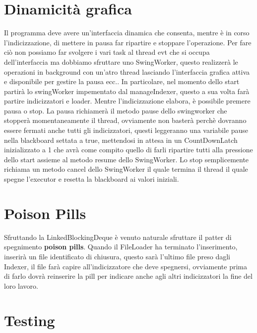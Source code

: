 \documentclass{article}
\begin{document}
\section{Dinamicità grafica}
Il programma deve avere un'interfaccia dinamica che consenta, mentre è in corso l'indicizzazione, di mettere in pausa far ripartire e stoppare l'operazione. Per fare ciò non possiamo far svolgere i vari task al thread evt che si occupa dell'interfaccia ma dobbiamo sfruttare uno SwingWorker, questo realizzerà le operazioni in background con un'atro thread lasciando l'interfaccia grafica attiva e disponibile per gestire la pausa ecc..
In particolare, nel momento dello start partirà lo swingWorker impementato dal manageIndexer, questo a sua volta farà partire indicizzatori e loader.
Mentre l'indicizzazione elabora, è possibile premere pausa o stop. La pausa richiamerà il metodo pause dello swingworker che stopperà momentaneamente il thread, ovviamente non basterà perchè dovranno essere fermati anche tutti gli indicizzatori, questi leggeranno una variabile pause nella blackboard settata a true,  mettendosi in attesa in un CountDownLatch inizializzato a 1 che avrà come compito quello di farli ripartire tutti alla pressione dello start assieme al metodo resume dello SwingWorker.
Lo stop semplicemente richiama un metodo cancel dello SwingWorker il quale termina il thread il quale spegne l'executor e resetta la blackboard ai valori iniziali.

\section{Poison Pills}
Sfruttando la LinkedBlockingDeque è venuto naturale sfruttare il patter di spegnimento \textbf{poison pills}. Quando il FileLoader ha terminato l'inserimento, inserirà un file identificato di chiusura, questo sarà l'ultimo file preso dagli Indexer, il file farà capire all'indicizzatore che deve spegnersi, ovviamente prima di farlo dovrà reinserire la pill per indicare anche agli altri indicizzatori la fine del loro lavoro.

\section{Testing}
\end{document}
